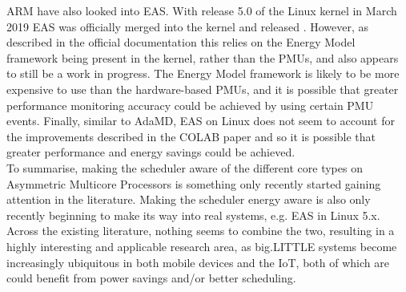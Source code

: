 ARM have also looked into EAS. With release 5.0 of the Linux kernel in March
2019 \cite{torvalds_linux_2019} EAS was officially merged into the kernel and
released \cite{noauthor_linux_2019}. However, as described in the official
documentation \cite{noauthor_energy_nodate} this relies on the Energy Model
framework being present in the kernel, rather than the PMUs, and also appears 
to still be a work in progress. The Energy Model framework is likely to be more 
expensive to use than the hardware-based PMUs, and it is possible that greater 
performance monitoring accuracy could be achieved by using certain PMU events. 
Finally, similar to AdaMD, EAS on Linux does not seem to account for the 
improvements described in the COLAB paper and so it is possible that greater 
performance and energy savings could be achieved.
\\

To summarise, making the scheduler aware of the different core types on
Asymmetric Multicore Processors is something only recently started gaining
attention in the literature. Making the scheduler energy aware is also only
recently beginning to make its way into real systems, e.g. EAS in Linux 5.x.
Across the existing literature, nothing seems to combine the two, resulting in a
highly interesting and applicable research area, as big.LITTLE systems become
increasingly ubiquitous in both mobile devices and the IoT, both of which are
could benefit from power savings and/or better scheduling.
